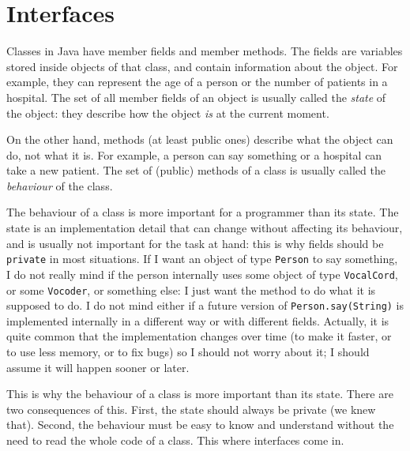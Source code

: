 %    
% 
%

\section{Interfaces}
\label{sec:interfaces}

Classes in Java have member fields and member methods. The fields are
variables stored inside objects of that class, and contain
information about the object. For example, they can represent the age
of a person or the number of patients in a hospital. The set of all
member fields of an object is usually called the \emph{state} of the
object: they describe how the object \emph{is} at the current moment. 

On the other hand, methods (at least public ones) describe what the
object can do, not what it is. 
For example, a person can say something or a hospital can take
a new patient. The set of (public) methods of a class is usually
called the \emph{behaviour} of the class. 

The behaviour of a class is more important for a programmer than its
state. The state is an implementation detail that can change without
affecting its behaviour, and is usually not important for the task at
hand: this is why fields should be \verb+private+ in most
situations. If I want an object of type \verb+Person+ to say
something, I do not really mind if the person internally uses some
object of type \verb+VocalCord+, or some \verb+Vocoder+, or something
else: I just want the method to do what it is supposed to do. I do not
mind either if a future version of \verb+Person.say(String)+ is
implemented internally in a different way or with different
fields. Actually, it is quite common that the implementation changes
over time (to make it faster, or to use less memory, or to fix bugs)
so I should not worry about it; I should assume it will happen sooner
or later. 

This is why the behaviour of a class is more important than its
state. There are two consequences of this. First, the state should
always be private (we knew that). 
Second, the behaviour must be easy to know and
understand without the need to read the whole code of a class. This
where interfaces come in. 

